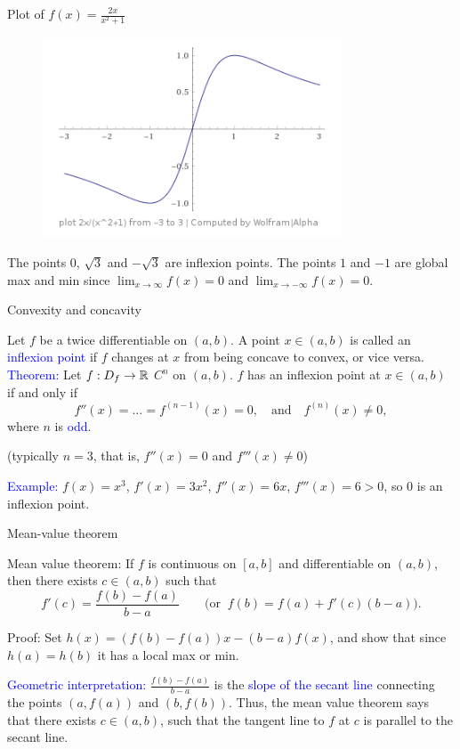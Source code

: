 \documentclass[11pt,aspectratio=169]{beamer}
\begin{document}
\begin{frame}{Plot of $f(x)=\frac{2x}{x^2+1}$}

\begin{figure}
\includegraphics[width=3.5in]{img/ima1} 
\end{figure}

The points 0, $\sqrt{3}$ and $-\sqrt{3}$ are inflexion points. The points $1$ and $-1$ are global max and min since $\lim_{x \rightarrow \infty} f(x)=0$ and $\lim_{x \rightarrow -\infty} f(x)=0$.
\end{frame}

\begin{frame}{Convexity and concavity}

Let $f$ be a twice differentiable on $(a,b)$. A point $x \in (a,b)$ is called an \textcolor{blue}{inflexion point} if $f$ changes at $x$ from being concave to convex, or vice versa.
\vskip 12pt
\textcolor{blue}{Theorem:} Let $f:D_f \rightarrow \mathbb R$ $C^n$ on $(a,b)$. $f$ has an inflexion point at $x \in (a,b)$ if and only if
$$
f''(x)=\dots=f^{(n-1)}(x)=0, \quad \text{and} \quad f^{(n)}(x) \neq 0,
$$
where $n$ is \textcolor{blue}{odd}.

\begin{tiny} (typically $n=3$, that is, $f''(x)=0$ and $f'''(x) \neq 0$)\end{tiny}
\vskip 12pt
 \textcolor{blue}{Example:} $f(x)=x^3$, $f'(x)=3x^2$, $f''(x)=6x$, $f'''(x)=6>0$, 
so 0 is an inflexion point.
\end{frame}


\begin{frame}[label=mv]{Mean-value theorem}
\begin{alertblock}{Mean value theorem:}
	If $f$ is continuous on $[a,b]$ and differentiable on $(a,b)$,
then there exists $c \in (a,b)$ such that
$$
f'(c)=\frac{f(b)-f(a)}{b-a}\qquad\mbox{(or}\;\; f(b)=f(a)+f'(c)(b-a)\mbox{)}.
$$
\end{alertblock}
\begin{tiny}Proof: Set $h(x)=(f(b)-f(a))x-(b-a)f(x)$, and show that since $h(a)=h(b)$ it has a local max or min. \end{tiny}
\vskip 12pt
\textcolor{blue}{Geometric interpretation:} $\frac{f(b)-f(a)}{b-a}$ is the \textcolor{blue}{slope of the secant line} connecting 
the points $(a, f(a))$ and $(b,f(b))$. Thus, the mean value theorem says that there exists $c \in (a,b)$, such that the tangent line to $f$ at $c$ is parallel to the secant line.
\end{frame}
\end{document}
